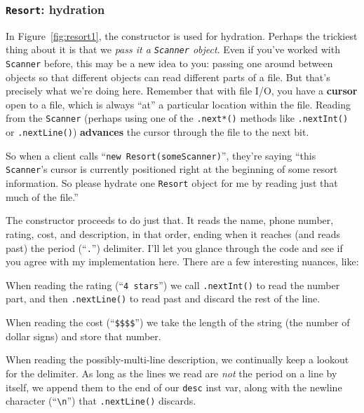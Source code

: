 \subsubsection{\texttt{Resort}: hydration}

In Figure~\ref{fig:resort1}, the constructor is used for hydration. Perhaps the
trickiest thing about it is that we \textit{pass it a \texttt{Scanner} object}.
Even if you've worked with \texttt{Scanner} before, this may be a new idea to
you: passing one around between objects so that different objects can read
different parts of a file. But that's precisely what we're doing here. Remember
that with file I/O, you have a \textbf{cursor} open to a file, which is always
``at'' a particular location within the file. Reading from the \texttt{Scanner}
(perhaps using one of the \texttt{.next*()} methods like \texttt{.nextInt()} or
\texttt{.nextLine()}) \textbf{advances} the cursor through the file to the next
bit.

So when a client calls ``\texttt{new Resort(someScanner)}'', they're saying
``this \texttt{Scanner}'s cursor is currently positioned right at the
beginning of some resort information. So please hydrate one \texttt{Resort}
object for me by reading just that much of the file.''

The constructor proceeds to do just that. It reads the name, phone number,
rating, cost, and description, in that order, ending when it reaches (and
reads past) the period (``\texttt{.}'') delimiter. I'll let you glance through
the code and see if you agree with my implementation here. There are a few
interesting nuances, like:

\begin{compactitem}

\item When reading the rating (``\texttt{4 stars}'') we call
\texttt{.nextInt()} to read the number part, and then \texttt{.nextLine()} to
read past and discard the rest of the line.

\item When reading the cost (``\texttt{\$\$\$\$}'') we take the length of the
string (the number of dollar signs) and store that number.

\item When reading the possibly-multi-line description, we continually keep a
lookout for the delimiter. As long as the lines we read are \textit{not} the
period on a line by itself, we append them to the end of our \texttt{desc}
inst var, along with the newline character (``\texttt{\textbackslash n}'') that
\texttt{.nextLine()} discards.

\end{compactitem}


